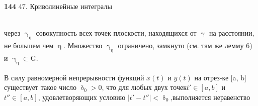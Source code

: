 \documentclass[a5paper, 10pt, twoside]{article}
\begin{document}
{\noindent\scriptsize{\bfseries 144}
\hfill{\textsection{ } 47. Криволинейные интегралы}\\ \\}
{
  через $\upgamma_\upeta$ совокупность всех точек плоскости, находящихся от $\upgamma$ на расстоянии, не большем чем $\upeta$. Множество $\upgamma_\upeta$ ограничено, замкнуто (см. там же лемму 6) и $\upgamma_\upeta{\subset}$G.
\par В силу равномерной непрерывности функций $x(t)$ и $y(t)$ на отрез-\linebreak ке
[a, b] существует такое число $\updelta_0 > 0$, что для любых двух точек\linebreak $t' \in[a,b]$ и $t''\in[a, b]$, удовлетворяющих условию $|t' - t''| < \updelta_0$,\linebreak выполняется неравенство
}
\end{document}
